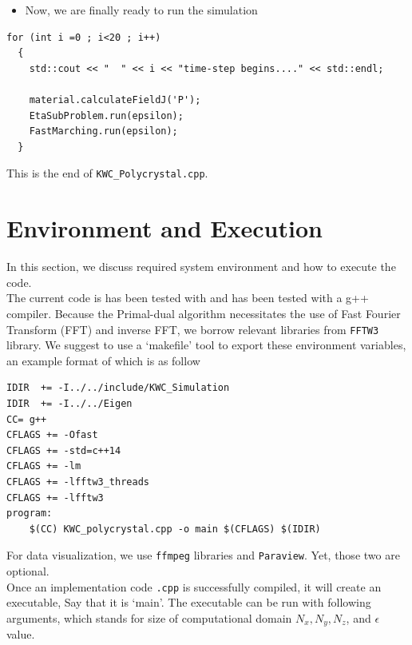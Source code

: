 \documentclass[11pt]{article}
\begin{document}
\begin{itemize} \item Now, we are finally ready to run the simulation \end{itemize}

\begin{tcolorbox}
\begin{lstlisting}[basicstyle=\footnotesize]
  for (int i =0 ; i<20 ; i++)
  {
    std::cout << "  " << i << "time-step begins...." << std::endl;
    
    material.calculateFieldJ('P');
    EtaSubProblem.run(epsilon);
    FastMarching.run(epsilon);
  }
\end{lstlisting}
\end{tcolorbox}

This is the end of \texttt{KWC\_Polycrystal.cpp}. 


\section{Environment and Execution}

In this section, we discuss required system environment 
and how to execute the code.  \\

The current code is has been tested with 
and has been tested with a g++ compiler. 
Because the Primal-dual algorithm necessitates the use of 
Fast Fourier Transform (FFT) and inverse FFT,
we borrow relevant libraries from \texttt{FFTW3} library. 
We suggest to use a `makefile' tool to export these environment variables, 
an example format of which is as follow
\begin{tcolorbox}[colback=white]
\begin{lstlisting}[basicstyle=\footnotesize]
IDIR  += -I../../include/KWC_Simulation
IDIR  += -I../../Eigen
CC= g++
CFLAGS += -Ofast
CFLAGS += -std=c++14
CFLAGS += -lm
CFLAGS += -lfftw3_threads
CFLAGS += -lfftw3
program: 
	$(CC) KWC_polycrystal.cpp -o main $(CFLAGS) $(IDIR)
\end{lstlisting}
\end{tcolorbox}

For data visualization, we use \texttt{ffmpeg} libraries and \texttt{Paraview}. 
Yet, those two are optional. \\


Once an implementation code \texttt{.cpp} 
is successfully compiled, it will create an executable, 
Say that it is `main'. The executable can be run with following arguments, 
which stands for size of computational domain $N_x,N_y,N_z$, 
and $\epsilon$ value. 
 
\end{document}
